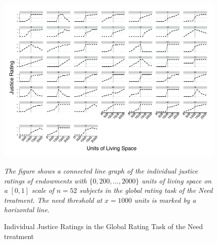\documentclass[12pt]{scrartcl}
\begin{document}
\begin{landscape}
\begin{figure}
   \centering
   \includegraphics{figures/figure_3.pdf}
   \begin{minipage}{0.7\linewidth}
      \footnotesize
      \textit{The figure shows a connected line graph of the individual justice ratings of endowments with $\{0,200,\ldots,2000\}$ units of living space on a $[0,1]$ scale of $n=52$ subjects in the global rating task of the Need treatment. The need threshold at $x=1000$ units is marked by a horizontal line.}
   \end{minipage}
   \caption{Individual Justice Ratings in the Global Rating Task of the Need treatment}
   \label{fig:individual_need}
\end{figure}
\end{landscape}
\end{document}
